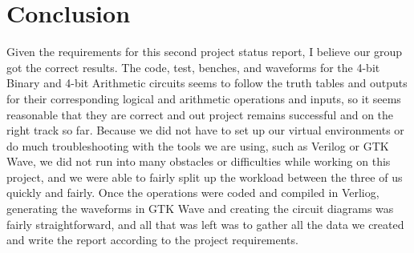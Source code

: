 \documentclass[runningheads, 12pt]{report}
\begin{document}
\section{Conclusion}

	Given the requirements for this second project status report, I believe our group got the correct results. The code, test, benches, and waveforms for the 4-bit Binary and 4-bit Arithmetic circuits seems to follow the truth tables and outputs for their corresponding logical and arithmetic operations and inputs, so it seems reasonable that they are correct and out project remains successful and on the right track so far. Because we did not have to set up our virtual environments or do much troubleshooting with the tools we are using, such as Verilog or GTK Wave, we did not run into many obstacles or difficulties while working on this project, and we were able to fairly split up the workload between the three of us quickly and fairly. Once the operations were coded and compiled in Verliog, generating the waveforms in GTK Wave and creating the circuit diagrams was fairly straightforward, and all that was left was to gather all the data we created and write the report according to the project requirements.   
	
	
\end{document}
